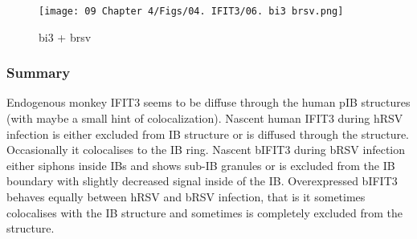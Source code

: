 \begin{figure}
    \centering
    \texttt{[image: 09 Chapter 4/Figs/04. IFIT3/06. bi3 brsv.png]}
    \caption[bi3 + brsv]{bi3 + brsv}
    \label{fig:bi3 + brsv}
\end{figure}

\subsubsection{Summary} \label{Summary-i3}
Endogenous monkey IFIT3 seems to be diffuse through the human pIB structures (with maybe a small hint of colocalization). Nascent human IFIT3 during hRSV infection is either excluded from IB structure or is diffused through the structure. Occasionally it colocalises to the IB ring. Nascent bIFIT3 during bRSV infection either siphons inside IBs and shows sub-IB granules or is excluded from the IB boundary with slightly decreased signal inside of the IB. Overexpressed bIFIT3 behaves equally between hRSV and bRSV infection, that is it sometimes colocalises with the IB structure and sometimes is completely excluded from the structure.